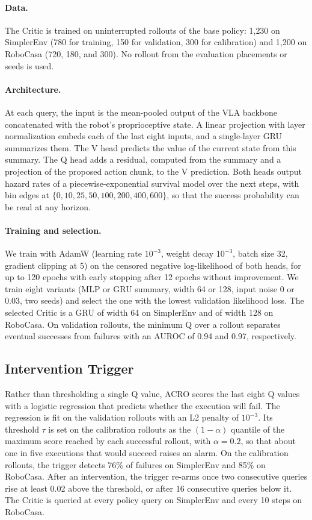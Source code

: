 \paragraph{Data.}
The Critic is trained on uninterrupted rollouts of the base policy: 1{,}230 on SimplerEnv (780 for training, 150 for validation, 300 for calibration) and 1{,}200 on RoboCasa (720, 180, and 300). No rollout from the evaluation placements or seeds is used.

\paragraph{Architecture.}
At each query, the input is the mean-pooled output of the VLA backbone concatenated with the robot's proprioceptive state. A linear projection with layer normalization embeds each of the last eight inputs, and a single-layer GRU summarizes them. The V head predicts the value of the current state from this summary. The Q head adds a residual, computed from the summary and a projection of the proposed action chunk, to the V prediction. Both heads output hazard rates of a piecewise-exponential survival model over the next steps, with bin edges at $\{0, 10, 25, 50, 100, 200, 400, 600\}$, so that the success probability can be read at any horizon.

\paragraph{Training and selection.}
We train with AdamW (learning rate $10^{-3}$, weight decay $10^{-3}$, batch size 32, gradient clipping at 5) on the censored negative log-likelihood of both heads, for up to 120 epochs with early stopping after 12 epochs without improvement. We train eight variants (MLP or GRU summary, width 64 or 128, input noise 0 or 0.03, two seeds) and select the one with the lowest validation likelihood loss. The selected Critic is a GRU of width 64 on SimplerEnv and of width 128 on RoboCasa. On validation rollouts, the minimum Q over a rollout separates eventual successes from failures with an AUROC of 0.94 and 0.97, respectively.

\subsection{Intervention Trigger}
\label{app:trigger}

Rather than thresholding a single Q value, ACRO scores the last eight Q values with a logistic regression that predicts whether the execution will fail. The regression is fit on the validation rollouts with an L2 penalty of $10^{-3}$. Its threshold $\tau$ is set on the calibration rollouts as the $(1-\alpha)$ quantile of the maximum score reached by each successful rollout, with $\alpha = 0.2$, so that about one in five executions that would succeed raises an alarm. On the calibration rollouts, the trigger detects 76\% of failures on SimplerEnv and 85\% on RoboCasa. After an intervention, the trigger re-arms once two consecutive queries rise at least 0.02 above the threshold, or after 16 consecutive queries below it. The Critic is queried at every policy query on SimplerEnv and every 10 steps on RoboCasa.

